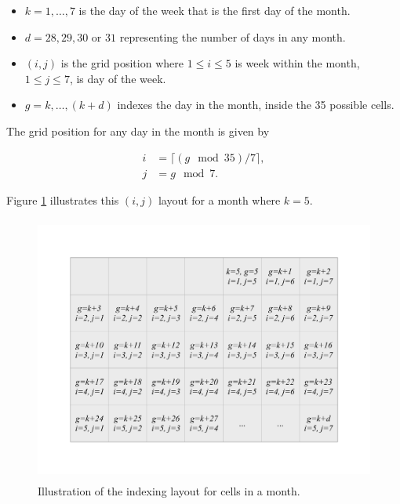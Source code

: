 \documentclass[article]{jss}
\providecommand{\tightlist}{%
  \setlength{\itemsep}{0pt}\setlength{\parskip}{0pt}}
\begin{document}
\begin{itemize}
\tightlist
\item
  \(k = 1, \dots , 7\) is the day of the week that is the first day of
  the month.
\item
  \(d = 28, 29, 30\) or \(31\) representing the number of days in any
  month.
\item
  \((i, j)\) is the grid position where \(1 \le i \le 5\) is week within
  the month, \(1 \le j \le 7\), is day of the week.
\item
  \(g = k, \dots,(k+d)\) indexes the day in the month, inside the 35
  possible cells.
\end{itemize}

The grid position for any day in the month is given by

\begin{equation}
  \begin{aligned}
  i &= \lceil (g \mod 35) / 7\rceil, \\
  j &= g \mod 7. \label{eq:grid}
  \end{aligned}
\end{equation}

Figure \ref{fig:month-diagram} illustrates this \((i,j)\) layout for a
month where \(k=5\).

\begin{CodeChunk}
\begin{figure}

{\centering \includegraphics[width=360pt,height=250pt]{figure/month} 

}

\caption[Illustration of the indexing layout for cells in a month]{Illustration of the indexing layout for cells in a month.}\label{fig:month-diagram}
\end{figure}
\end{CodeChunk}
\end{document}
